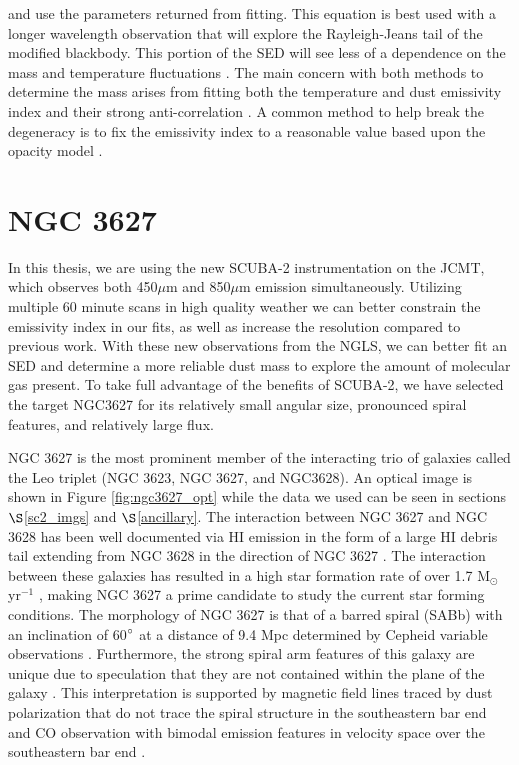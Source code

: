 \noindent and use the parameters returned from fitting.  This equation is best used with a longer wavelength observation that will explore the Rayleigh-Jeans tail of the modified blackbody.  This portion of the SED will see less of a dependence on the mass and temperature fluctuations \citep{draine2007}.  The main concern with both methods to determine the mass arises from fitting both the temperature and dust emissivity index and their strong anti-correlation \citep{galametz2012,tabatabaei2014}.  A common method to help break the degeneracy is to fix the emissivity index to a reasonable value based upon the opacity model \citep{tabatabaei2014}.

\section{NGC 3627}

In this thesis, we are using the new SCUBA-2 instrumentation on the JCMT, which observes both 450$\mu$m and 850$\mu$m emission simultaneously.  Utilizing multiple 60 minute scans in high quality weather we can better constrain the emissivity index in our fits, as well as increase the resolution compared to previous work.  With these new observations from the NGLS, we can better fit an SED and determine a more reliable dust mass to explore the amount of molecular gas present.  To take full advantage of the benefits of SCUBA-2, we have selected the target NGC3627 for its relatively small angular size, pronounced spiral features, and relatively large flux.

NGC 3627 is the most prominent member of the interacting trio of galaxies called the Leo triplet (NGC 3623, NGC 3627,  and NGC3628).  An optical image is shown in Figure \ref{fig:ngc3627_opt} while the data we used can be seen in sections $\S$\ref{sc2_imgs} and $\S$\ref{ancillary}.  The interaction between NGC 3627 and NGC 3628 has been well documented via HI emission in the form of a large HI debris tail extending from NGC 3628 in the direction of NGC 3627 \citep{rots1978,haynes1979}.  The interaction between these galaxies has resulted in a high star formation rate of over 1.7 M$_\odot$ yr$^{-1}$ \citep{calzetti2010}, making NGC 3627 a prime candidate to study the current star forming conditions.  The morphology of NGC 3627 is that of a barred spiral (SABb) with an inclination of 60$\degree$ \citep{reuter1996} at a distance of 9.4 Mpc determined by Cepheid variable observations \citep{freedman2001}.  Furthermore, the strong spiral arm features of this galaxy are unique due to speculation that they are not contained within the plane of the galaxy \citep{dumke2011,soida2001}.  This interpretation is supported by magnetic field lines traced by dust polarization that do not trace the spiral structure in the southeastern bar end \citep{soida2001} and CO observation with bimodal emission features in velocity space over the southeastern bar end \citep{dumke2011}.

